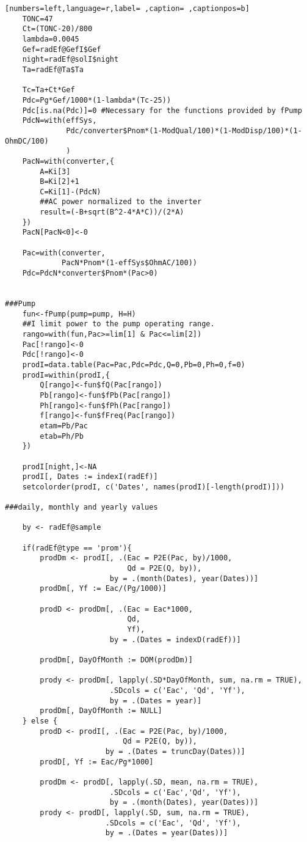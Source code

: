 \begin{lstlisting}[numbers=left,language=r,label= ,caption= ,captionpos=b]
    TONC=47
    Ct=(TONC-20)/800
    lambda=0.0045
    Gef=radEf@GefI$Gef
    night=radEf@solI$night
    Ta=radEf@Ta$Ta

    Tc=Ta+Ct*Gef
    Pdc=Pg*Gef/1000*(1-lambda*(Tc-25))
    Pdc[is.na(Pdc)]=0 #Necessary for the functions provided by fPump
    PdcN=with(effSys,
              Pdc/converter$Pnom*(1-ModQual/100)*(1-ModDisp/100)*(1-OhmDC/100)
              )
    PacN=with(converter,{
        A=Ki[3]
        B=Ki[2]+1
        C=Ki[1]-(PdcN)
        ##AC power normalized to the inverter
        result=(-B+sqrt(B^2-4*A*C))/(2*A)
    })
    PacN[PacN<0]<-0

    Pac=with(converter,
             PacN*Pnom*(1-effSys$OhmAC/100))
    Pdc=PdcN*converter$Pnom*(Pac>0)


###Pump
    fun<-fPump(pump=pump, H=H)
    ##I limit power to the pump operating range.
    rango=with(fun,Pac>=lim[1] & Pac<=lim[2]) 
    Pac[!rango]<-0
    Pdc[!rango]<-0
    prodI=data.table(Pac=Pac,Pdc=Pdc,Q=0,Pb=0,Ph=0,f=0)	
    prodI=within(prodI,{
        Q[rango]<-fun$fQ(Pac[rango])
        Pb[rango]<-fun$fPb(Pac[rango])
        Ph[rango]<-fun$fPh(Pac[rango])
        f[rango]<-fun$fFreq(Pac[rango])
        etam=Pb/Pac
        etab=Ph/Pb
    })

    prodI[night,]<-NA
    prodI[, Dates := indexI(radEf)]
    setcolorder(prodI, c('Dates', names(prodI)[-length(prodI)]))

###daily, monthly and yearly values

    by <- radEf@sample

    if(radEf@type == 'prom'){
        prodDm <- prodI[, .(Eac = P2E(Pac, by)/1000,
                            Qd = P2E(Q, by)),
                        by = .(month(Dates), year(Dates))]
        prodDm[, Yf := Eac/(Pg/1000)]

        prodD <- prodDm[, .(Eac = Eac*1000,
                            Qd,
                            Yf),
                        by = .(Dates = indexD(radEf))]

        prodDm[, DayOfMonth := DOM(prodDm)]

        prody <- prodDm[, lapply(.SD*DayOfMonth, sum, na.rm = TRUE),
                        .SDcols = c('Eac', 'Qd', 'Yf'),
                        by = .(Dates = year)]
        prodDm[, DayOfMonth := NULL]
    } else {
        prodD <- prodI[, .(Eac = P2E(Pac, by)/1000,
                           Qd = P2E(Q, by)),
                       by = .(Dates = truncDay(Dates))]
        prodD[, Yf := Eac/Pg*1000]

        prodDm <- prodD[, lapply(.SD, mean, na.rm = TRUE),
                        .SDcols = c('Eac','Qd', 'Yf'),
                        by = .(month(Dates), year(Dates))]
        prody <- prodD[, lapply(.SD, sum, na.rm = TRUE),
                       .SDcols = c('Eac', 'Qd', 'Yf'),
                       by = .(Dates = year(Dates))]


\end{lstlisting}
